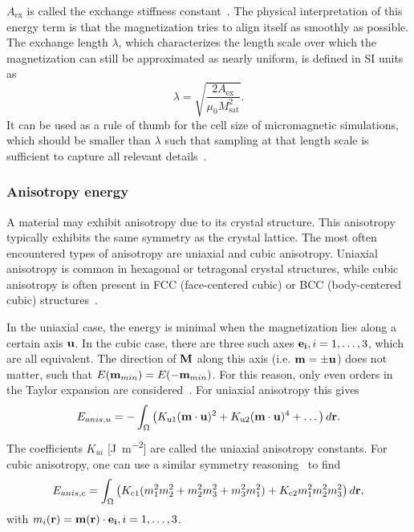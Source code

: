 \documentclass[11pt,a4paper,english,twoside]{article}
\begin{document}
$A_\mathrm{ex}$ is called the exchange stiffness constant~\cite{Gilbert1956}. The physical interpretation of this energy term is that the magnetization tries to align itself as smoothly as possible.
The exchange length $\lambda$, which characterizes the length scale over which the magnetization can still be approximated as nearly uniform, is defined in SI units \cite{ExchangeLength, ExchangeLength_original, MuMax3} as
\begin{equation}
    \lambda = \sqrt{\frac{2 A_\mathrm{ex}}{\mu_0 M_\mathrm{sat}^2}} \mathrm{.}
    \label{eq:Energy_ExchangeEnergy_ExchangeLength}
\end{equation}
It can be used as a rule of thumb for the cell size of micromagnetic simulations, which should be smaller than $\lambda$ such that sampling at that length scale is sufficient to capture all relevant details~\cite{ExchangeLength}.

\subsubsection{Anisotropy energy}
A material may exhibit anisotropy due to its crystal structure. This anisotropy typically exhibits the same symmetry as the crystal lattice. The most often encountered types of anisotropy are uniaxial and cubic anisotropy. Uniaxial anisotropy is common in hexagonal or tetragonal crystal structures, while cubic anisotropy is often present in FCC (face-centered cubic) or BCC (body-centered cubic) structures~\cite{abert2013discrete,Gilbert1956}. \par
In the uniaxial case, the energy is minimal when the magnetization lies along a certain axis $\vb{u}$. In the cubic case, there are three such axes $\vb{e_i}, i=1,\dots,3$, which are all equivalent. The direction of $\vb{M}$ along this axis (i.e. $\vb{m}=\pm \vb{u}$) does not matter, such that $E(\vb{m}_{min}) = E(-\vb{m}_{min})$. For this reason, only even orders in the Taylor expansion are considered~\cite{abert2013discrete}. For uniaxial anisotropy this gives
\begin{equation}
    E_{anis,u} = - \int_\Omega \big(K_\mathrm{u1} (\vb{m} \cdot \vb{u})^2 + K_\mathrm{u2} (\vb{m} \cdot \vb{u})^4 + \dots\big) \, d\vb{r} \mathrm{.} \label{eq:Energy_Term_AnisUniaxial}
\end{equation}
The coefficients $K_{ui}$ [\si{\joule\per\metre\squared}] are called the uniaxial anisotropy constants.
For cubic anisotropy, one can use a similar symmetry reasoning~\cite{abert2013discrete} to find
\begin{equation}
    E_{anis,c} = \int_\Omega \big(K_\mathrm{c1} (m_1^2m_2^2 + m_2^2m_3^2 + m_3^2m_1^2) + K_\mathrm{c2} m_1^2m_2^2m_3^2\big) \, d\vb{r} \mathrm{,} \label{eq:Energy_Term_AnisCubic}
\end{equation}
with $m_i(\vb{r}) = \vb{m}(\vb{r}) \cdot \vb{e_i}, i=1,\dots,3$.
\end{document}
